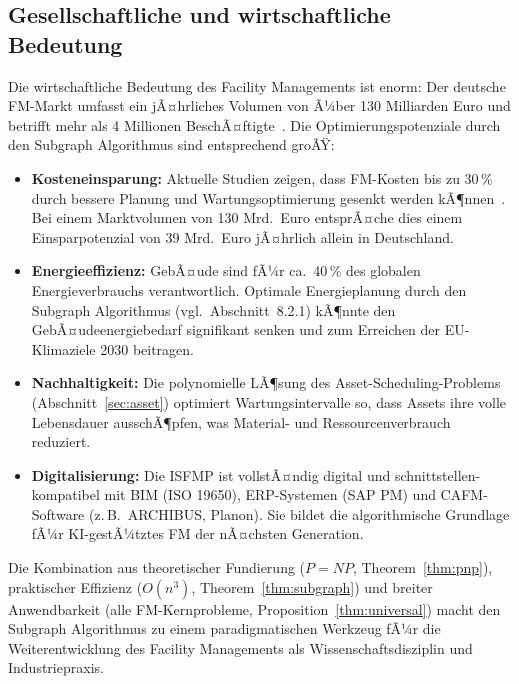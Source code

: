 ﻿\documentclass[a4paper,12pt]{article}
\theoremstyle{definition}
\begin{document}
\subsection{Gesellschaftliche und wirtschaftliche Bedeutung}

Die wirtschaftliche Bedeutung des Facility Managements ist enorm:
Der deutsche FM-Markt umfasst ein jÃ¤hrliches Volumen von Ã¼ber 130 Milliarden Euro
und betrifft mehr als 4 Millionen BeschÃ¤ftigte~\cite{din41011}.
Die Optimierungspotenziale durch den Subgraph Algorithmus sind entsprechend groÃŸ:

\begin{itemize}
    \item \textbf{Kosteneinsparung:} Aktuelle Studien zeigen, dass FM-Kosten
          bis zu 30\,\% durch bessere Planung und Wartungsoptimierung gesenkt werden
          kÃ¶nnen~\cite{din41011}. Bei einem Marktvolumen von 130 Mrd.\ Euro
          entsprÃ¤che dies einem Einsparpotenzial von 39 Mrd.\ Euro jÃ¤hrlich allein
          in Deutschland.

    \item \textbf{Energieeffizienz:} GebÃ¤ude sind fÃ¼r ca.\ 40\,\% des globalen
          Energieverbrauchs verantwortlich. Optimale Energieplanung durch den
          Subgraph Algorithmus (vgl.\ Abschnitt~8.2.1) kÃ¶nnte den GebÃ¤udeenergiebedarf
          signifikant senken und zum Erreichen der EU-Klimaziele 2030 beitragen.

    \item \textbf{Nachhaltigkeit:} Die polynomielle LÃ¶sung des Asset-Scheduling-Problems
          (Abschnitt~\ref{sec:asset}) optimiert Wartungsintervalle so, dass Assets
          ihre volle Lebensdauer ausschÃ¶pfen, was Material- und Ressourcenverbrauch
          reduziert.

    \item \textbf{Digitalisierung:} Die ISFMP ist vollstÃ¤ndig digital und
          schnittstellen-kompatibel mit BIM (ISO 19650), ERP-Systemen (SAP PM)
          und CAFM-Software (z.\,B.\ ARCHIBUS, Planon). Sie bildet die algorithmische
          Grundlage fÃ¼r KI-gestÃ¼tztes FM der nÃ¤chsten Generation.
\end{itemize}

Die Kombination aus theoretischer Fundierung ($P = NP$, Theorem~\ref{thm:pnp}),
praktischer Effizienz ($O(n^3)$, Theorem~\ref{thm:subgraph}) und breiter
Anwendbarkeit (alle FM-Kernprobleme, Proposition~\ref{thm:universal}) macht den
Subgraph Algorithmus zu einem paradigmatischen Werkzeug fÃ¼r die Weiterentwicklung
des Facility Managements als Wissenschaftsdisziplin und Industriepraxis.
\end{document}

